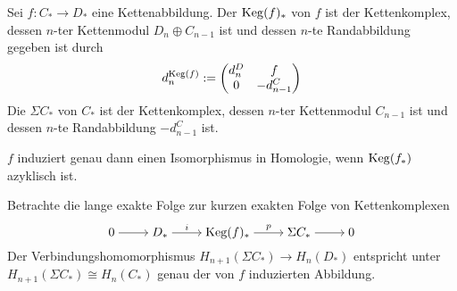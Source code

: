 \begin{definition}[{name=[Kegel und Einhängung]}]
	Sei $f \colon C_* \to D_*$ eine Kettenabbildung. Der  $\operatorname{Keg}(f)_*$ von $f$ ist der Kettenkomplex, dessen $n$-ter Kettenmodul $D_n \oplus C_{n-1}$ ist und dessen 
	$n$-te Randabbildung gegeben ist durch
	\[
		d^{\operatorname{Keg}(f)}_n := \begin{pmatrix}
			d^D_n & f\\
			0 & -d^C_{n-1}
		\end{pmatrix}
	\]
	Die  $\Sigma C_*$ von $C_*$ ist der Kettenkomplex, dessen $n$-ter Kettenmodul $C_{n-1}$ ist und dessen $n$-te Randabbildung $-d_{n-1}^C$ ist.
\end{definition}

\begin{lemma}
	$f$ induziert genau dann einen Isomorphismus in Homologie, wenn $\operatorname{Keg}(f_*)$ azyklisch ist.
\end{lemma}
\begin{beweis}
	Betrachte die lange exakte Folge zur kurzen exakten Folge von Kettenkomplexen
	\[
		\begin{tikzcd}[cramped]
			0 \rar & D_* \rar["i"] & \Keg(f)_* \rar["p"] & \Sigma C_* \rar & 0
		\end{tikzcd}
	\]
	Der Verbindungshomomorphismus $H_{n+1}(\Sigma C_*) \to H_n(D_*)$ entspricht unter $H_{n+1}(\Sigma C_*) \cong H_n(C_*)$ genau der von $f$ induzierten Abbildung.
\end{beweis}

